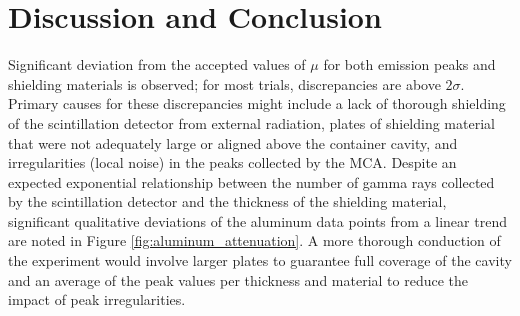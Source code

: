 \documentclass[11pt]{article}
\begin{document}
\section{Discussion and Conclusion}

Significant deviation from the accepted values of $\mu$ for both
emission peaks
and shielding materials is observed; for most trials, discrepancies
are above $2\sigma$. Primary causes for these discrepancies might include
a lack of thorough
shielding of the scintillation detector from external radiation,
plates of shielding material
that were not adequately large or aligned above the container cavity,
and irregularities (local noise) in the peaks collected by the MCA.
Despite an expected
exponential relationship between the number of gamma rays collected
by the scintillation
detector and the thickness of the shielding material, significant
qualitative deviations of the aluminum data points from a linear
trend are noted in Figure \ref{fig:aluminum_attenuation}. A more
thorough conduction of the experiment would involve larger
plates to guarantee full coverage of the cavity and an average of the
peak values per thickness and material to reduce the impact of peak
irregularities.



\end{document}
